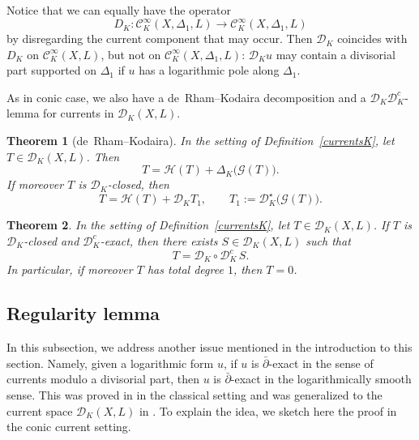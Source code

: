 \documentclass[english]{amsart}
\newcommand{\cC}{\mathcal{C}}
\newcommand{\cH}{\mathcal{H}}
\newcommand{\cG}{\mathcal{G}}
\newcommand{\dbar}{\bar \partial}
\newtheorem{thm}{Theorem}[section]
\numberwithin{equation}{thm}
\begin{document}
Notice that we can equally have the operator
	\[
	D_K:\cC^\infty_K(X,\Delta_1,L)\to \cC^\infty_K(X,\Delta_1,L)
	\]
by disregarding the current component that may occur.
Then $\mathcal{D}_K$ coincides with $D_K$ on $\cC^\infty_K(X,L)$, but not on $\cC^\infty_K(X,\Delta_1, L)$: $\mathcal{D}_K u$ may contain a divisorial part supported on $\Delta_1$ if $u$ has a logarithmic pole along $\Delta_1$.


As in conic case, we also have a de~Rham--Kodaira decomposition and a $\mathcal{D}_K\mathcal{D}_K^c$-lemma for currents in $\mathcal{D}_K(X,L)$.

\begin{thm}[de~Rham--Kodaira]\label{decompcurrentconicK}
	In the setting of Definition~\ref{currentsK}, let $T\in \mathcal{D}_K(X,L)$.
	Then
	\[
	T = \cH(T) + \Delta_K\bigl(\cG(T)\bigr).
	\]
	If moreover $T$ is $\mathcal{D}_K$-closed, then
	\[
	T = \cH(T) + \mathcal{D}_K T_1,
	\qquad T_1 := \mathcal{D}_K^\star\bigl(\cG(T)\bigr).
	\]
\end{thm}

\begin{thm}\label{ddbarcurrentconicK}
	In the setting of Definition~\ref{currentsK}, let $T\in \mathcal{D}_K(X,L)$.
	If $T$ is $\mathcal{D}_K$-closed and $\mathcal{D}_K^c$-exact, then there exists $S\in \mathcal{D}_K(X,L)$ such that
	\[
	T = \mathcal{D}_K\circ \mathcal{D}_K^c\, S.
	\]
	In particular, if moreover $T$ has total degree $1$, then $T=0$.
\end{thm}

			
			\bigskip
			\subsection{Regularity lemma}\label{regularitysection}
			
			In this subsection, we address another issue mentioned in the introduction to this section. Namely, given a logarithmic form $u$, if $u$ is $\dbar$-exact in the sense of currents modulo a divisorial part, then $u$ is $\dbar$-exact in the logarithmically smooth sense.
			This was proved in \cite{LRW} in the classical setting and was generalized to the current space $\mathcal{D}_K(X,L)$ in \cite{CDHP}. To explain the idea, we sketch here the proof in the conic current setting.
			
\end{document}
